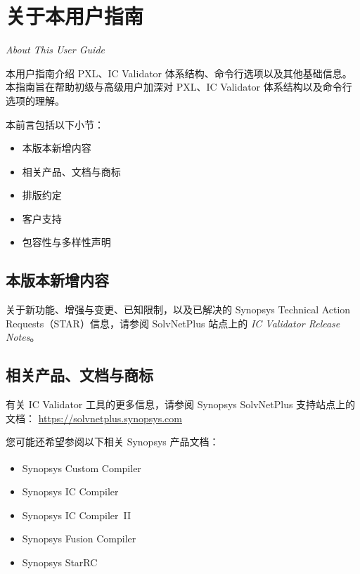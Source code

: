 \chapter*{关于本用户指南}

\noindent\textit{About This User Guide}

本用户指南介绍 PXL、IC Validator 体系结构、命令行选项以及其他基础信息。
本指南旨在帮助初级与高级用户加深对 PXL、IC Validator 体系结构以及命令行选项的理解。

本前言包括以下小节：
\begin{itemize}
  \item 本版本新增内容
  \item 相关产品、文档与商标
  \item 排版约定
  \item 客户支持
  \item 包容性与多样性声明
\end{itemize}

\section*{本版本新增内容}

关于新功能、增强与变更、已知限制，以及已解决的 Synopsys Technical Action Requests（STAR）信息，请参阅 SolvNetPlus 站点上的
\textit{IC Validator Release Notes}。

\section*{相关产品、文档与商标}

有关 IC Validator 工具的更多信息，请参阅 Synopsys SolvNetPlus 支持站点上的文档：
\url{https://solvnetplus.synopsys.com}

您可能还希望参阅以下相关 Synopsys 产品文档：
\begin{itemize}
  \item Synopsys\textsuperscript{\textregistered} Custom Compiler\texttrademark
  \item Synopsys IC Compiler\texttrademark
  \item Synopsys IC Compiler\texttrademark\ II
  \item Synopsys Fusion Compiler\texttrademark
  \item Synopsys StarRC\texttrademark
\end{itemize}

